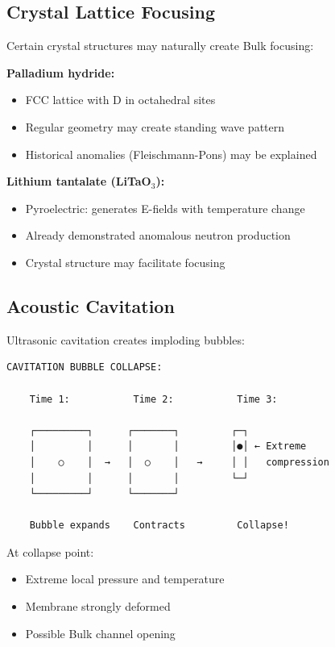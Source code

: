\documentclass[12pt,a4paper]{article}
\begin{document}
\subsection{Crystal Lattice Focusing}

Certain crystal structures may naturally create Bulk focusing:

\textbf{Palladium hydride:}
\begin{itemize}
    \item FCC lattice with D in octahedral sites
    \item Regular geometry may create standing wave pattern
    \item Historical anomalies (Fleischmann-Pons) may be explained
\end{itemize}

\textbf{Lithium tantalate (LiTaO$_3$):}
\begin{itemize}
    \item Pyroelectric: generates E-fields with temperature change
    \item Already demonstrated anomalous neutron production
    \item Crystal structure may facilitate focusing
\end{itemize}

\subsection{Acoustic Cavitation}

Ultrasonic cavitation creates imploding bubbles:

\begin{verbatim}
CAVITATION BUBBLE COLLAPSE:

    Time 1:           Time 2:           Time 3:
    
    ┌─────────┐      ┌───────┐         ┌─┐
    │         │      │       │         │●│ ← Extreme
    │    ○    │  →   │  ○    │   →     │ │   compression
    │         │      │       │         └─┘
    └─────────┘      └───────┘
    
    Bubble expands    Contracts         Collapse!
\end{verbatim}

At collapse point:
\begin{itemize}
    \item Extreme local pressure and temperature
    \item Membrane strongly deformed
    \item Possible Bulk channel opening
\end{itemize}
\end{document}
